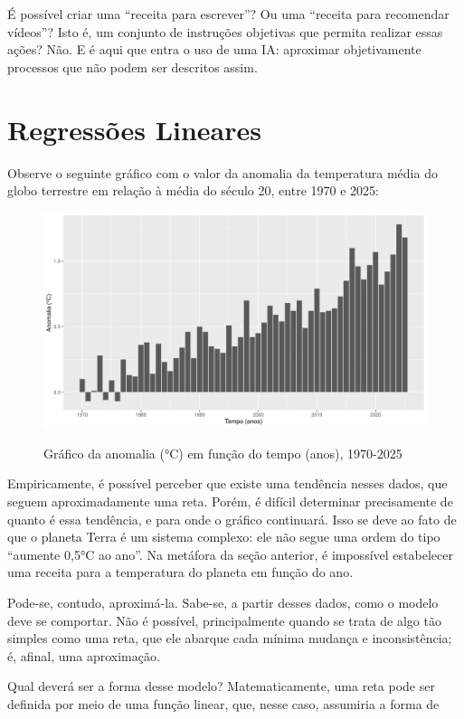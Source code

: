 É possível criar uma ``receita para escrever''?
Ou uma ``receita para recomendar vídeos''?
Isto é, um conjunto de instruções objetivas que permita realizar essas ações?
Não. 
E é aqui que entra o uso de uma IA: aproximar objetivamente processos que não podem ser descritos assim.

\section{Regressões Lineares}\label{sec:2:regres}
Observe o seguinte gráfico com o valor da anomalia da temperatura média do globo terrestre em relação à média do século 20, entre 1970 e 2025:

\begin{figure}[H]
    \centering
    \caption{Gráfico da anomalia (°C) em função do tempo (anos), 1970-2025}
    \includegraphics[width=\linewidth]{static/R/plot/anom-1-hist.png}
    \label{fig:2:anom-1-hist}
\end{figure}

Empiricamente, é possível perceber que existe uma tendência nesses dados, que seguem aproximadamente uma reta.
Porém, é difícil determinar precisamente de quanto é essa tendência, e para onde o gráfico continuará. 
Isso se deve ao fato de que o planeta Terra é um sistema complexo: ele não segue uma ordem do tipo ``aumente 0,5°C ao ano''.
Na metáfora da seção anterior, é impossível estabelecer uma receita para a temperatura do planeta em função do ano.

Pode-se, contudo, aproximá-la.
Sabe-se, a partir desses dados, como o modelo deve se comportar.
Não é possível, principalmente quando se trata de algo tão simples como uma reta, que ele abarque cada mínima mudança e inconsistência; é, afinal, uma aproximação.

Qual deverá ser a forma desse modelo?
Matematicamente, uma reta pode ser definida por meio de uma função linear, que, nesse caso, assumiria a forma de

